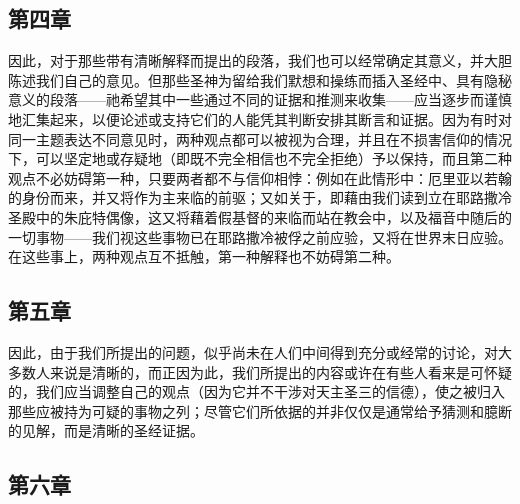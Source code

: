 
\subsection{第四章}

\par

因此，对于那些带有清晰解释而提出的段落，我们也可以经常确定其意义，并大胆陈述我们自己的意见。但那些圣神为留给我们默想和操练而插入圣经中、具有隐秘意义的段落——祂希望其中一些通过不同的证据和推测来收集——应当逐步而谨慎地汇集起来，以便论述或支持它们的人能凭其判断安排其断言和证据。因为有时对同一主题表达不同意见时，两种观点都可以被视为合理，并且在不损害信仰的情况下，可以坚定地或存疑地（即既不完全相信也不完全拒绝）予以保持，而且第二种观点不必妨碍第一种，只要两者都不与信仰相悖：例如在此情形中：厄里亚以若翰的身份而来，并又将作为主来临的前驱；又如关于，即藉由我们读到立在耶路撒冷圣殿中的朱庇特偶像，这又将藉着假基督的来临而站在教会中，以及福音中随后的一切事物——我们视这些事物已在耶路撒冷被俘之前应验，又将在世界末日应验。在这些事上，两种观点互不抵触，第一种解释也不妨碍第二种。\par


\subsection{第五章}

\par

因此，由于我们所提出的问题，似乎尚未在人们中间得到充分或经常的讨论，对大多数人来说是清晰的，而正因为此，我们所提出的内容或许在有些人看来是可怀疑的，我们应当调整自己的观点（因为它并不干涉对天主圣三的信德），使之被归入那些应被持为可疑的事物之列；尽管它们所依据的并非仅仅是通常给予猜测和臆断的见解，而是清晰的圣经证据。\par


\subsection{第六章}

